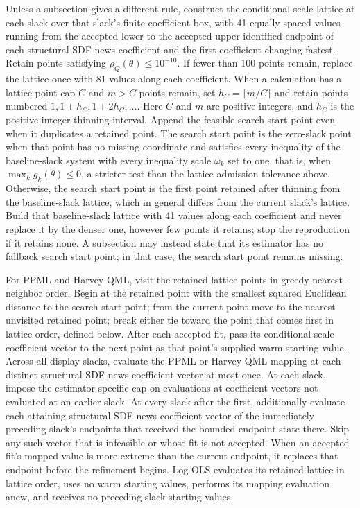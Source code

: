 \documentclass[11pt]{article}
\begin{document}
Unless a subsection gives a different rule, construct the conditional-scale lattice at each slack
over that slack's finite coefficient box, with 41 equally spaced values running from the accepted
lower to the accepted upper identified endpoint of each structural SDF-news coefficient and the
first coefficient changing fastest. Retain points satisfying \(\rho_Q(\theta)\le10^{-10}\). If fewer than 100 points
remain, replace the lattice once with 81 values along each coefficient. When a calculation has a
lattice-point cap \(C\) and \(m>C\) points remain, set \(h_C=\lceil m/C\rceil\) and retain points
numbered \(1,1+h_C,1+2h_C,\ldots\). Here \(C\) and \(m\) are positive integers, and \(h_C\) is the
positive integer thinning interval. Append the feasible search start point even when it duplicates a
retained point. The search start point is the zero-slack point when that point has no missing
coordinate and satisfies every inequality of the baseline-slack system with every inequality scale
\(\omega_k\) set to one, that is, when \(\max_k g_k(\theta)\le0\), a stricter test than the lattice
admission tolerance above. Otherwise, the search start point is the first point retained after thinning from the
baseline-slack lattice, which in general differs from the current slack's lattice. Build that
baseline-slack lattice with 41 values along each coefficient and never replace it by the denser one,
however few points it retains; stop the reproduction if it retains none. A subsection
may instead state that its estimator has no fallback search start point; in that case, the search
start point remains missing.

For PPML and Harvey QML, visit the retained lattice points in greedy nearest-neighbor order. Begin
at the retained point with the smallest squared Euclidean distance to the search start point; from the
current point move to the nearest unvisited retained point; break either tie toward the point that
comes first in lattice order, defined below. After each accepted fit, pass its conditional-scale coefficient vector
to the next point as that point's supplied warm starting value. Across all display slacks, evaluate
the PPML or Harvey QML mapping at each distinct structural SDF-news coefficient vector at most once. At each
slack, impose the estimator-specific cap on evaluations at coefficient vectors not evaluated at an
earlier slack. At every slack after the first,
additionally evaluate each attaining structural SDF-news coefficient vector of the immediately
preceding slack's
endpoints that received the bounded endpoint state there. Skip any such vector that is infeasible or
whose fit is not accepted. When an accepted fit's mapped value is more extreme than the current
endpoint, it replaces that endpoint before the refinement begins. Log-OLS evaluates its retained
lattice in lattice order, uses no warm starting values, performs its mapping evaluation anew, and
receives no preceding-slack starting values.
\end{document}
